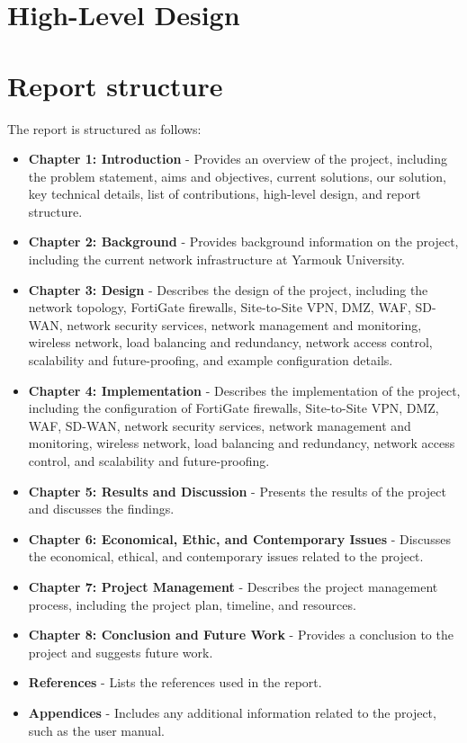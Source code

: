 \documentclass[12pt]{report}
\begin{document}
\section{High-Level Design}
\section{Report structure}
The report is structured as follows:
\begin{itemize}
    \item \textbf{Chapter 1: Introduction} - Provides an overview of the project, including the problem statement, aims and objectives, current solutions, our solution, key technical details, list of contributions, high-level design, and report structure.
    \item \textbf{Chapter 2: Background} - Provides background information on the project, including the current network infrastructure at Yarmouk University.
    \item \textbf{Chapter 3: Design} - Describes the design of the project, including the network topology, FortiGate firewalls, Site-to-Site VPN, DMZ, WAF, SD-WAN, network security services, network management and monitoring, wireless network, load balancing and redundancy, network access control, scalability and future-proofing, and example configuration details.
    \item \textbf{Chapter 4: Implementation} - Describes the implementation of the project, including the configuration of FortiGate firewalls, Site-to-Site VPN, DMZ, WAF, SD-WAN, network security services, network management and monitoring, wireless network, load balancing and redundancy, network access control, and scalability and future-proofing.
    \item \textbf{Chapter 5: Results and Discussion} - Presents the results of the project and discusses the findings.
    \item \textbf{Chapter 6: Economical, Ethic, and Contemporary Issues} - Discusses the economical, ethical, and contemporary issues related to the project. %

    \item \textbf{Chapter 7: Project Management} - Describes the project management process, including the project plan, timeline, and resources.
    \item \textbf{Chapter 8: Conclusion and Future Work} - Provides a conclusion to the project and suggests future work.
    \item \textbf{References} - Lists the references used in the report.
    \item \textbf{Appendices} - Includes any additional information related to the project, such as the user manual.
\end{itemize}
\end{document}
